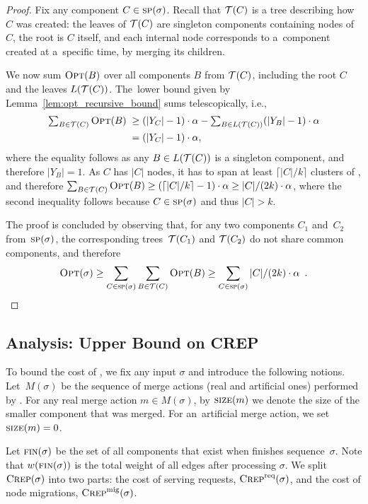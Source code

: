 \begin{proof}
Fix any component $C \in \textsc{sp}(\sigma)$. Recall that $\mathcal{T}(C)$ is a tree
describing how $C$ was created: the leaves of $\mathcal{T}(C)$ are singleton
components containing nodes of $C$, the root is $C$ itself, and each internal
node corresponds to a~component created at a~specific time, by merging its
children.

We now sum $\textsc{Opt}(B)$ over all components $B$ from $\mathcal{T}(C)$, including 
the root $C$ and the leaves $L(\mathcal{T}(C))$. The~lower bound given 
by Lemma~\ref{lem:opt_recursive_bound} sums telescopically, i.e.,
\begin{align*}
	\textstyle \sum_{B \in \mathcal{T}(C)} \textsc{Opt}(B) \;
		\geq &\; \textstyle (|Y_C|-1) \cdot \alpha - \sum_{B \in L(\mathcal{T}(C))} (|Y_B|-1) \cdot \alpha \\
		= &\; \textstyle (|Y_C|-1) \cdot \alpha,
\end{align*}
where the equality follows as any $B \in L(\mathcal{T}(C))$ is a singleton component,
and therefore $|Y_B| = 1$. As $C$ has $|C|$ nodes, it has to span at least
$\lceil |C|/k \rceil$ clusters of \OPT, and therefore $\sum_{B \in \mathcal{T}(C)}
\textsc{Opt}(B) \geq (\lceil |C|/k \rceil -1) \cdot \alpha \geq |C| / (2 k) \cdot
\alpha$, where the second inequality follows because $C \in \textsc{sp}(\sigma)$ and
thus $|C| > k$.

The proof is concluded by observing that, for any two components $C_1$
and~$C_2$ from~$\textsc{sp}(\sigma)$, the corresponding trees~$\mathcal{T}(C_1)$ and $\mathcal{T}(C_2)$ do not share common
components, and therefore
\[
\textsc{Opt}(\sigma) \geq \sum_{C \in \textsc{sp}(\sigma)} \sum_{B
  \in \mathcal{T}(C)} \textsc{Opt}(B) \geq \sum_{C \in \textsc{sp}(\sigma)} |C| / (2k) \cdot \alpha\enspace.
\]
\end{proof}


\subsection{Analysis: Upper Bound on CREP}
\label{sec:crep_upper}

To bound the cost of \CREP, we fix any input $\sigma$ and introduce the following 
notions. Let~$M(\sigma)$ be the sequence of merge actions 
(real and artificial ones) performed by \CREP. 
For any real merge action $m \in M(\sigma)$, by
$\textsc{size}(m)$ we denote the size of the smaller component that was
merged. For an~artificial merge action, we set $\textsc{size}(m) = 0$.

Let $\textsc{fin}(\sigma)$ be the set of all components that exist when \CREP finishes
sequence~$\sigma$. Note that $w(\textsc{fin}(\sigma))$ is the total weight of all
edges after processing $\sigma$. We split 
$\textsc{Crep}(\sigma)$ into two parts: the cost of serving requests, $\textsc{Crep}^\textnormal{req}(\sigma)$, 
and the cost of node migrations, $\textsc{Crep}^\textnormal{mig}(\sigma)$. 


